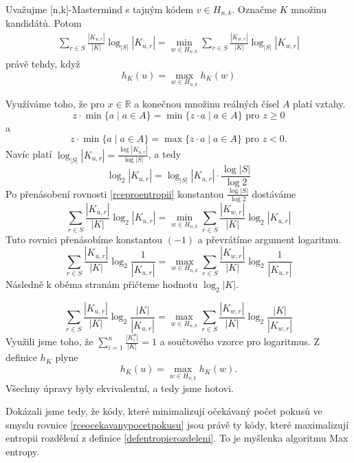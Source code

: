 \begin{veta} \label{vetaekvivalencemaxentropy}
    Uvažujme [n,k]-Mastermind s tajným kódem $v\in H_{n,k}$. Označme $K$ množinu kandidátů. Potom 
    \begin{align}\label{rceproentropii}
        \sum_{r\in S} \frac{|K_{u,r}|}{|K|}\log_{|S|}|K_{u,r}| = \min_{w \in H_{n,k}} \sum_{r\in S} \frac{|K_{w,r}|}{|K|}\log_{|S|}|K_{w,r}|
    \end{align}
    právě tehdy, když 
    \[h_K(u) = \max_{w \in H_{n,k}} h_K(w) \]
    
\end{veta}
\begin{dukaz} Využíváme toho, že pro $x \in \mathbb{R}$ a konečnou množinu reálných čísel $A$ platí vztahy.
\[z \cdot \min\{a \mid a \in A\} = \min\{z\cdot a \mid a \in A\} \textrm{ pro } z \geq 0\]
a 
\[z \cdot \min \{a \mid a \in A\} = \max\{z\cdot a \mid a \in A\}\textrm{ pro } z < 0.\]
Navíc platí $\log_{|S|} |K_{u,r}| = \frac{\log |K_{u,r}|}{\log |S|}$, a tedy
    \[\log_{2} |K_{u,r}| = \log_{|S|} |K_{u,r}| \cdot \frac{\log |S|}{\log 2}\]
Po přenásobení rovnosti \ref{rceproentropii} konstantou $\frac{\log|S|}{\log2}$ dostáváme
\[\sum_{r\in S} \frac{|K_{u,r}|}{|K|}\log_{2}|K_{u,r}| = \min_{w \in H_{n,k}} \sum_{r\in S} \frac{|K_{w,r}|}{|K|}\log_{2}|K_{u,r}|\]
Tuto rovnici přenásobíme konstantou $(-1)$ a převrátíme argument logaritmu.
\[\sum_{r\in S} \frac{|K_{u,r}|}{|K|}\log_{2}\frac{1}{|K_{u,r}|} = \max_{w \in H_{n,k}} \sum_{r\in S} \frac{|K_{w,r}|}{|K|}\log_{2}\frac{1}{|K_{u,r}|}\]
Následně k oběma stranám přičteme hodnotu $\log_2|K|$.

\[\sum_{r\in S} \frac{|K_{u,r}|}{|K|}\log_{2}\frac{|K|}{|K_{u,r}|} = \max_{w \in H_{n,k}} \sum_{r\in S} \frac{|K_{w,r}|}{|K|}\log_{2}\frac{|K|}{|K_{w,r}|}\]
Využili jsme toho, že $\sum_{i=1}^n \frac{|K^u_i|}{|K|} = 1$ a součtového vzorce pro logaritmus. Z definice $h_K$ plyne 
\[h_K(u) = \max_{w \in H_{n,k}}  h_K(w) .\]
Všechny úpravy byly ekvivalentní, a tedy jsme hotovi.
\end{dukaz}

Dokázali jsme tedy, že kódy, které minimalizují očekávaný počet pokusů ve smyslu rovnice \ref{rceocekavanypocetpokusu} jsou právě ty kódy, které maximalizují entropii rozdělení z definice \ref{defentropierozdeleni}. To je myšlenka algoritmu Max entropy. 








